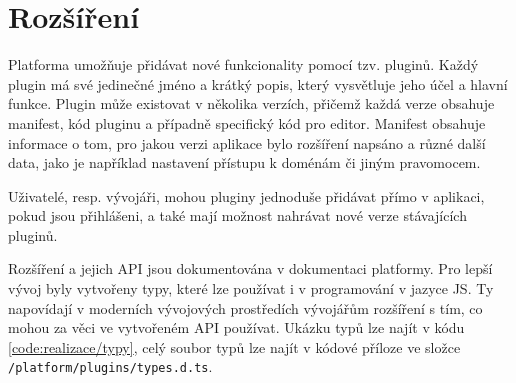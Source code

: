 


\section{Rozšíření}

Platforma umožňuje přidávat nové funkcionality pomocí tzv. pluginů. 
Každý plugin má své jedinečné jméno a krátký popis, který vysvětluje jeho účel a hlavní funkce. 
Plugin může existovat v několika verzích, přičemž každá verze obsahuje manifest, kód pluginu a případně specifický kód pro editor.
Manifest obsahuje informace o tom, pro jakou verzi aplikace bylo rozšíření napsáno a různé další data, jako je například nastavení přístupu k doménám či jiným pravomocem.

Uživatelé, resp. vývojáři, mohou pluginy jednoduše přidávat přímo v aplikaci, pokud jsou přihlášeni, a také mají možnost nahrávat nové verze stávajících pluginů. 

Rozšíření a jejich API jsou dokumentována v dokumentaci platformy.
Pro lepší vývoj byly vytvořeny typy, které lze používat i v programování v jazyce JS.
Ty napovídají v moderních vývojových prostředích vývojářům rozšíření s tím, co mohou za věci ve vytvořeném API používat.
Ukázku typů lze najít v kódu \ref{code:realizace/typy}, celý soubor typů lze najít v kódové příloze ve složce \verb|/platform/plugins/types.d.ts|.


